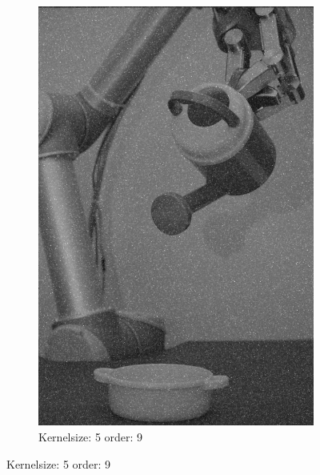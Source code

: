 \begin{figure}[H]
\begin{subfigure}[b]{0.3\textwidth}
        \includegraphics[width=\textwidth]{img1/img_1_gaus_5_9.png}
        \caption{Kernelsize: 5 order: 9}
          \label{fig:img1_contra5_9}
    \end{subfigure}
    
    
    

\end{figure}
